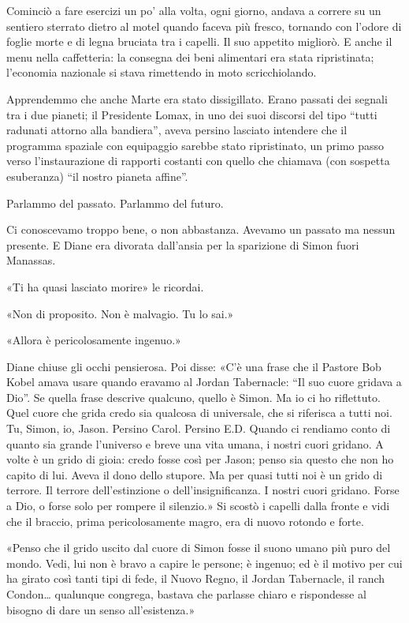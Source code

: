 Cominciò a fare esercizi un po' alla volta, ogni giorno, andava a
correre su un sentiero sterrato dietro al motel quando faceva più
fresco, tornando con l'odore di foglie morte e di legna bruciata tra i
capelli. Il suo appetito migliorò. E anche il menu nella caffetteria: la
consegna dei beni alimentari era stata ripristinata; l'economia
nazionale si stava rimettendo in moto scricchiolando.

Apprendemmo che anche Marte era stato dissigillato. Erano passati dei
segnali tra i due pianeti; il Presidente Lomax, in uno dei suoi discorsi
del tipo ``tutti radunati attorno alla bandiera'', aveva persino
lasciato intendere che il programma spaziale con equipaggio sarebbe
stato ripristinato, un primo passo verso l'instaurazione di rapporti
costanti con quello che chiamava (con sospetta esuberanza) ``il nostro
pianeta affine''.

Parlammo del passato. Parlammo del futuro.

Ci conoscevamo troppo bene, o non abbastanza. Avevamo un passato ma
nessun presente. E Diane era divorata dall'ansia per la sparizione di
Simon fuori Manassas.

«Ti ha quasi lasciato morire» le ricordai.

«Non di proposito. Non è malvagio. Tu lo sai.»

«Allora è pericolosamente ingenuo.»

Diane chiuse gli occhi pensierosa. Poi disse: «C'è una frase che il
Pastore Bob Kobel amava usare quando eravamo al Jordan Tabernacle: ``Il
suo cuore gridava a Dio''. Se quella frase descrive qualcuno, quello è
Simon. Ma io ci ho riflettuto. Quel cuore che grida credo sia qualcosa
di universale, che si riferisca a tutti noi. Tu, Simon, io, Jason.
Persino Carol. Persino E.D. Quando ci rendiamo conto di quanto sia
grande l'universo e breve una vita umana, i nostri cuori gridano. A
volte è un grido di gioia: credo fosse così per Jason; penso sia questo
che non ho capito di lui. Aveva il dono dello stupore. Ma per quasi
tutti noi è un grido di terrore. Il terrore dell'estinzione o
dell'insignificanza. I nostri cuori gridano. Forse a Dio, o forse solo
per rompere il silenzio.» Si scostò i capelli dalla fronte e vidi che il
braccio, prima pericolosamente magro, era di nuovo rotondo e forte.

«Penso che il grido uscito dal cuore di Simon fosse il suono umano più
puro del mondo. Vedi, lui non è bravo a capire le persone; è ingenuo; ed
è il motivo per cui ha girato così tanti tipi di fede, il Nuovo Regno,
il Jordan Tabernacle, il ranch Condon\ldots{} qualunque congrega,
bastava che parlasse chiaro e rispondesse al bisogno di dare un senso
all'esistenza.»

